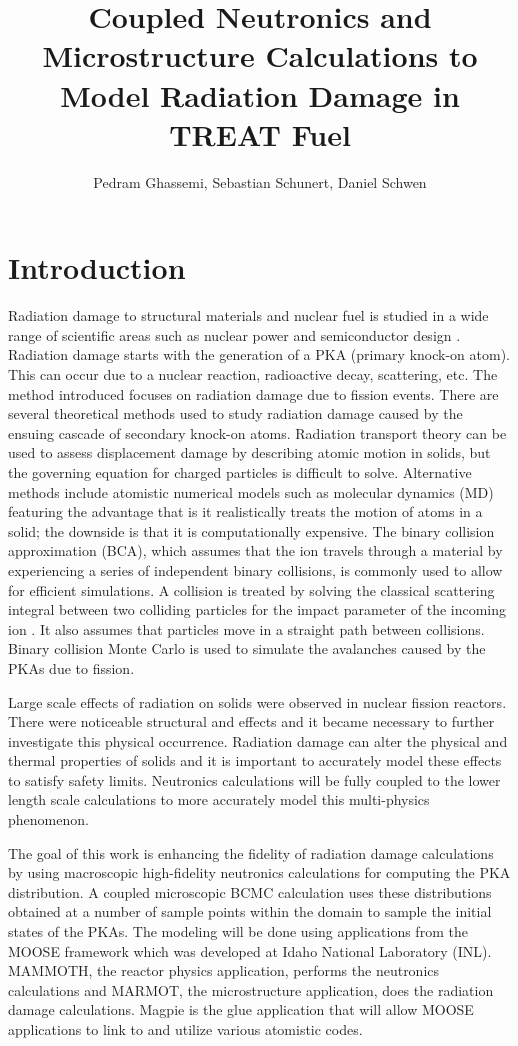 \documentclass{anstrans}
\title{Coupled Neutronics and Microstructure Calculations to Model Radiation Damage in TREAT Fuel}
\author{Pedram Ghassemi, Sebastian Schunert, Daniel Schwen}
\institute{Idaho National Laboratory, Idaho Falls, ID}
\begin{document}
\section{Introduction}
Radiation damage to structural materials and nuclear fuel is studied in a wide
range of scientific areas such as
nuclear power and semiconductor design \cite{basics}. Radiation damage
starts with the generation of a PKA (primary knock-on atom). This can occur due
to a nuclear reaction, radioactive decay, scattering,
etc. The method introduced focuses on radiation damage due to fission events.
There are several theoretical methods used to study radiation damage caused by
the ensuing cascade of secondary knock-on atoms.
Radiation transport theory can be used to assess displacement damage by describing
atomic motion in solids, but the governing equation for charged particles is difficult to solve.
Alternative methods include atomistic numerical models such as molecular dynamics
(MD) featuring the advantage that is it realistically treats the motion of atoms in a solid;
the downside is that it is computationally expensive. The binary collision approximation (BCA),
which assumes that the ion travels through a material by experiencing a series of
independent binary collisions, is commonly used to allow for efficient simulations.
A collision is treated by solving the classical scattering integral between two
colliding particles for the impact parameter of the incoming ion \cite{BCA}. It also
assumes that particles move in a straight path between collisions. Binary collision
Monte Carlo is used to simulate the avalanches caused by the PKAs due to fission.

Large scale effects of radiation on solids were observed in nuclear
fission reactors. There were noticeable structural and effects and it became
necessary to further investigate this physical occurrence.
Radiation damage can alter the physical and thermal
properties of solids and it is important to accurately model these effects to
satisfy safety limits.
Neutronics calculations will be fully coupled to the lower
length scale calculations to more accurately model this multi-physics phenomenon.

The goal of this work is enhancing the fidelity of radiation damage calculations
by using macroscopic high-fidelity neutronics calculations for computing the PKA
distribution. A coupled microscopic BCMC calculation uses these distributions obtained
at a number of sample points within the domain to sample the initial states of the PKAs.
The modeling will be done using applications from the MOOSE framework which was
developed at Idaho National Laboratory (INL). MAMMOTH, the reactor physics
application, performs the neutronics calculations and MARMOT, the microstructure
application, does the radiation damage calculations. Magpie is the glue application
that will allow MOOSE applications to link to and utilize various atomistic codes.
\end{document}
